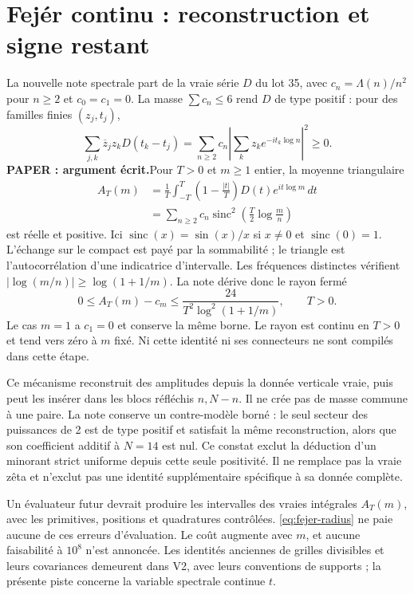 \documentclass[11pt,a4paper]{article}
\theoremstyle{remark}
\newcommand{\Lam}{\Lambda}
\newcommand{\paper}{\textbf{PAPER : argument écrit.}\space}
\begin{document}
\section{Fejér continu : reconstruction et signe restant}\label{sec:fejer}
La nouvelle note spectrale part de la vraie série $D$ du lot 35, avec
$c_n=\Lam(n)/n^2$ pour $n\ge2$ et $c_0=c_1=0$.
La masse $\sum c_n\le6$ rend $D$ de type positif : pour des familles
finies $(z_j,t_j)$,
\[
\sum_{j,k}\overline z_jz_kD(t_k-t_j)
=\sum_{n\ge2}c_n\left|\sum_k z_ke^{-it_k\log n}\right|^2\ge0.
\]
\paper Pour $T>0$ et $m\ge1$ entier, la moyenne triangulaire
\begin{equation}\label{eq:fejer-cont}
\begin{split}
A_T(m)&=\frac1T\int_{-T}^{T}\left(1-\frac{|t|}{T}\right)
D(t)e^{it\log m}\,dt\\
&=\sum_{n\ge2}c_n\operatorname{sinc}^2\!\left(\frac T2\log\frac mn\right)
\end{split}
\end{equation}
est réelle et positive. Ici $\operatorname{sinc}(x)=\sin(x)/x$ si
$x\ne0$ et $\operatorname{sinc}(0)=1$. L'échange sur le compact est
payé par la sommabilité ; le triangle est l'autocorrélation d'une
indicatrice d'intervalle. Les fréquences distinctes vérifient
$|\log(m/n)|\ge\log(1+1/m)$. La note dérive donc le rayon fermé
\begin{equation}\label{eq:fejer-radius}
0\le A_T(m)-c_m\le
\frac{24}{T^2\log^2(1+1/m)},\qquad T>0.
\end{equation}
Le cas $m=1$ a $c_1=0$ et conserve la même borne. Le rayon est continu
en $T>0$ et tend vers zéro à $m$ fixé. Ni cette identité ni ses
connecteurs ne sont compilés dans cette étape.

Ce mécanisme reconstruit des amplitudes depuis la donnée verticale vraie,
puis peut les insérer dans les blocs réfléchis $n,N-n$. Il ne crée pas
de masse commune à une paire. La note conserve un contre-modèle borné :
le seul secteur des puissances de 2 est de type positif et satisfait la
même reconstruction, alors que son coefficient additif à $N=14$ est nul.
Ce constat exclut la déduction d'un minorant strict uniforme depuis cette
seule positivité. Il ne remplace pas la vraie zêta et n'exclut pas une
identité supplémentaire spécifique à sa donnée complète.

Un évaluateur futur devrait produire les intervalles des vraies
intégrales $A_T(m)$, avec les primitives, positions et quadratures
contrôlées. \eqref{eq:fejer-radius} ne paie aucune de ces erreurs
d'évaluation. Le coût augmente avec $m$, et aucune faisabilité à $10^8$
n'est annoncée. Les identités anciennes de grilles divisibles et leurs
covariances demeurent dans V2, avec leurs conventions de supports ; la
présente piste concerne la variable spectrale continue $t$.
\end{document}
